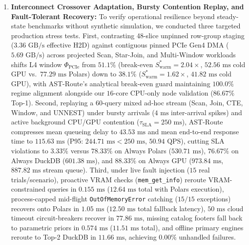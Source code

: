 \documentclass[10pt,a4paper]{article}
\begin{document}
\begin{enumerate}[leftmargin=1.5em,itemsep=2pt]
\item \textbf{Interconnect Crossover Adaptation, Bursty Contention Replay, and Fault-Tolerant Recovery:} To verify operational resilience beyond steady-state benchmarks without synthetic simulation, we conducted three targeted production stress tests. First, contrasting 48-slice unpinned row-group staging ($3.36\text{ GB/s}$ effective H2D) against contiguous pinned PCIe Gen4 DMA ($5.69\text{ GB/s}$) across projected Scan, Star-Join, and Multi-Window workloads shifts L4 window $\Phi_{\text{PCIe}}$ from $51.1\%$ (break-even $S_{\text{warm}}^* = 2.04\times$, $52.56\text{ ms}$ cold GPU vs.\ $77.29\text{ ms}$ Polars) down to $38.1\%$ ($S_{\text{warm}}^* = 1.62\times$, $41.82\text{ ms}$ cold GPU), with AST-Route's analytical break-even guard maintaining $100.0\%$ regime alignment alongside our $16$-core CPU-only node validation ($86.67\%$ Top-1). Second, replaying a $60$-query mixed ad-hoc stream (Scan, Join, CTE, Window, and UNNEST) under bursty arrivals ($4\text{ ms}$ inter-arrival spikes) and active background CPU/GPU contention ($\tau_{\text{SLA}}=250\text{ ms}$), AST-Route compresses mean queueing delay to $43.53\text{ ms}$ and mean end-to-end response time to $115.63\text{ ms}$ (P95: $244.71\text{ ms} < 250\text{ ms}$, $50.94\text{ QPS}$), cutting SLA violations to $3.33\%$ versus $78.33\%$ on Always Polars ($530.71\text{ ms}$), $76.67\%$ on Always DuckDB ($601.38\text{ ms}$), and $88.33\%$ on Always GPU ($973.84\text{ ms}$, $887.82\text{ ms}$ stream queue). Third, under live fault injection ($15$ real trials/scenario), proactive VRAM checks (\texttt{mem\_get\_info}) reroute VRAM-constrained queries in $0.155\text{ ms}$ ($12.64\text{ ms}$ total with Polars execution), process-capped mid-flight \texttt{OutOfMemoryError} catching ($15/15$ exceptions) recovers onto Polars in $1.05\text{ ms}$ ($12.50\text{ ms}$ total fallback latency), $50\text{ ms}$ cloud timeout circuit-breakers recover in $77.86\text{ ms}$, missing catalog footers fall back to parametric priors in $0.574\text{ ms}$ ($11.51\text{ ms}$ total), and offline primary engines reroute to Top-2 DuckDB in $11.66\text{ ms}$, achieving $0.00\%$ unhandled failures.
\end{enumerate}

\end{document}
